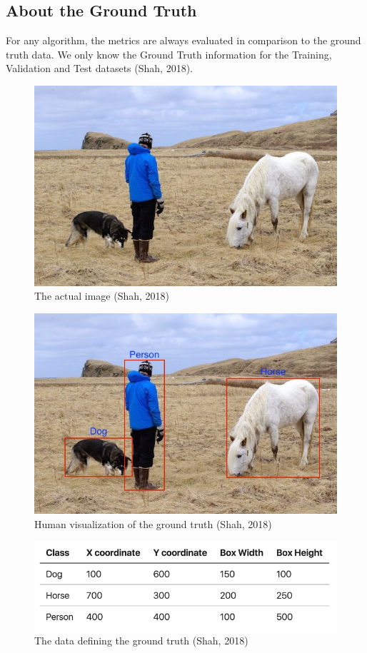 \documentclass[]{article}
\begin{document}
\subsection{About the Ground Truth}
For any algorithm, the metrics are always evaluated in comparison to the ground truth data. We only know the Ground Truth information for the Training, Validation and Test datasets (Shah, 2018).
\pagebreak
\begin{figure}[!h]
	\includegraphics[scale=0.65]{ground2}
	\caption{The actual image (Shah, 2018)}
	\label{Fig:Race}
\end{figure}

\begin{figure}[!h]
	\includegraphics[scale=0.65]{ground}
	\caption{Human visualization of the ground truth (Shah, 2018)}
	\label{Fig:Race}
\end{figure}


\begin{figure}[!h]
	\includegraphics[scale=0.65]{ground3}
	\caption{The data defining the ground truth (Shah, 2018)}
	\label{Fig:Race}
\end{figure}
\end{document}
